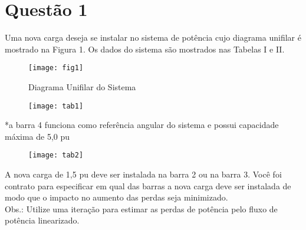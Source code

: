 \section{Questão 1}
Uma nova carga deseja se instalar no sistema de potência cujo diagrama unifilar é mostrado na Figura 1. Os dados do sistema são mostrados nas Tabelas I e II.

\begin{figure}[h]
\texttt{[image: fig1]}
\centering
\caption{Diagrama Unifilar do Sistema}
\label{fig:fig1}
\end{figure}

\begin{figure}[h]
\texttt{[image: tab1]}
\centering
\end{figure}


*a barra 4 funciona como referência angular do sistema e possui capacidade máxima de 5,0 pu\\

\begin{figure}[h]
\texttt{[image: tab2]}
\centering
\end{figure}

A nova carga de 1,5 pu deve ser instalada na barra 2 ou na barra 3. Você foi contrato para especificar em qual das barras a nova carga deve ser instalada de modo que o impacto no aumento das perdas seja minimizado.\\

Obs.: Utilize uma iteração para estimar as perdas de potência pelo fluxo de potência linearizado.\\
